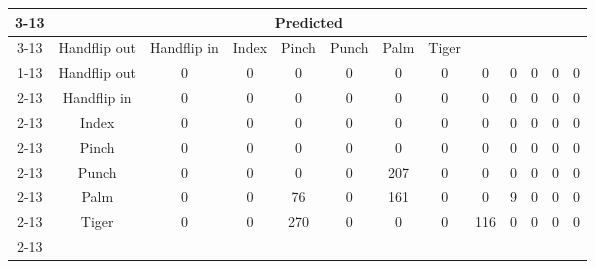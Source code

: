 \documentclass{standalone}
\begin{document}
 
 \begin{tabular}{|c |c |c |c |c |c |c |c |c |c |c |c |c |}
\cline{3-13}\multicolumn{2}{c|}{} & \multicolumn{11}{c|}{Predicted} \\ 
\cline{3-13} \multicolumn{2}{c |}{ } & Handflip out & Handflip in & Index & Pinch & Punch & Palm & Tiger\\ 
\cline{1-13}\multirow{11}{*}{\rotatebox[origin=c]{90}{Actual}} & Handflip out & 0 & 0 & 0 & 0 & 0 & 0 & 0 & 0 & 0 & 0 & 0\\ 
 \cline{2-13} & Handflip in & 0 & 0 & 0 & 0 & 0 & 0 & 0 & 0 & 0 & 0 & 0\\ 
 \cline{2-13} & Index & 0 & 0 & 0 & 0 & 0 & 0 & 0 & 0 & 0 & 0 & 0\\ 
 \cline{2-13} & Pinch & 0 & 0 & 0 & 0 & 0 & 0 & 0 & 0 & 0 & 0 & 0\\ 
 \cline{2-13} & Punch & 0 & 0 & 0 & 0 & 207 & 0 & 0 & 0 & 0 & 0 & 0\\ 
 \cline{2-13} & Palm & 0 & 0 & 76 & 0 & 161 & 0 & 0 & 9 & 0 & 0 & 0\\ 
 \cline{2-13} & Tiger & 0 & 0 & 270 & 0 & 0 & 0 & 116 & 0 & 0 & 0 & 0\\ 
 \cline{2-13}\hline \end{tabular}
 
\end{document}
